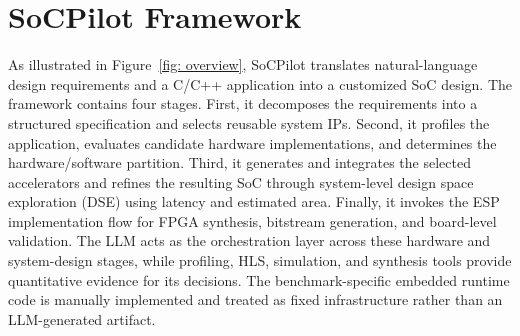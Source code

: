 \section{SoCPilot Framework}
As illustrated in Figure~\ref{fig: overview}, SoCPilot translates natural-language design requirements and a C/C++ application into a customized SoC design. The framework contains four stages. First, it decomposes the requirements into a structured specification and selects reusable system IPs. Second, it profiles the application, evaluates candidate hardware implementations, and determines the hardware/software partition. Third, it generates and integrates the selected accelerators and refines the resulting SoC through system-level design space exploration (DSE) using latency and estimated area. Finally, it invokes the ESP implementation flow for FPGA synthesis, bitstream generation, and board-level validation. The LLM acts as the orchestration layer across these hardware and system-design stages, while profiling, HLS, simulation, and synthesis tools provide quantitative evidence for its decisions. The benchmark-specific embedded runtime code is manually implemented and treated as fixed infrastructure rather than an LLM-generated artifact.

